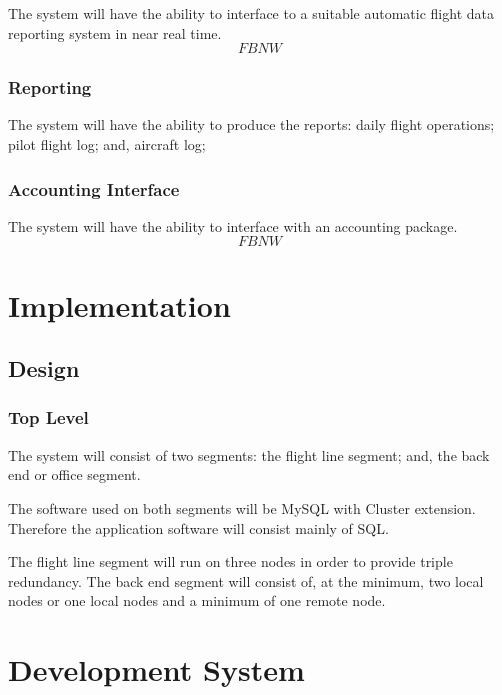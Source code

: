 \documentclass[a4paper]{report}
\numberwithin{equation}{chapter}
\begin{document}
The system will have the ability to interface to a suitable automatic flight data reporting system in near real time. \[FBNW\]

\subsection[Operator Reporting]{Reporting}

The system will have the ability to produce the reports: daily flight operations; pilot flight log; and, aircraft log;

\subsection[Accounting Interface]{Accounting Interface}

The system will have the ability to interface with an accounting package. \[FBNW\]

\bigskip

\clearpage\setcounter{page}{1}
\chapter[Implementation]{Implementation}

\section[Design]{Design}

\subsection[Top Level]{Top Level}

The system will consist of two segments: the flight line segment; and, the back end or office segment.

The software used on both segments will be MySQL with Cluster extension. Therefore the application software will consist mainly of SQL.

The flight line segment will run on three nodes in order to provide triple redundancy. The back end segment will consist of, at the minimum, two local nodes or one local nodes and a minimum of one remote node.

\bigskip

\chapter[Development System]{Development System}
\end{document}
